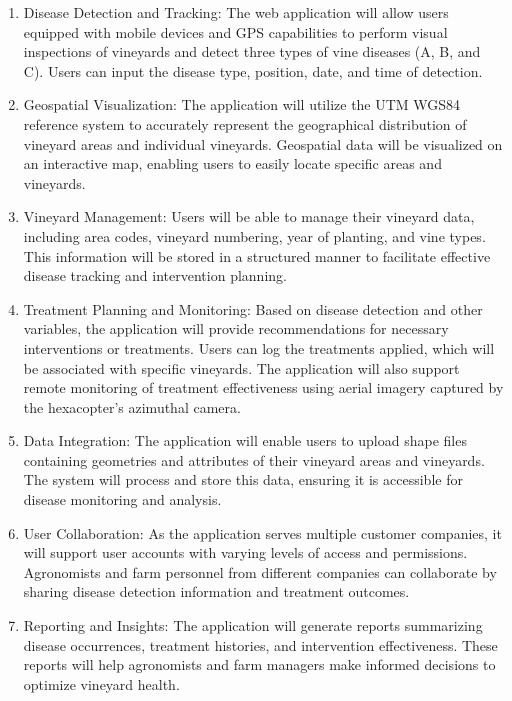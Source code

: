\begin{enumerate}
\item Disease Detection and Tracking: The web application will allow users equipped with mobile devices and GPS capabilities to perform visual inspections of vineyards and detect three types of vine diseases (A, B, and C). Users can input the disease type, position, date, and time of detection.

\item Geospatial Visualization: The application will utilize the UTM WGS84 reference system to accurately represent the geographical distribution of vineyard areas and individual vineyards. Geospatial data will be visualized on an interactive map, enabling users to easily locate specific areas and vineyards.

\item Vineyard Management: Users will be able to manage their vineyard data, including area codes, vineyard numbering, year of planting, and vine types. This information will be stored in a structured manner to facilitate effective disease tracking and intervention planning.

\item Treatment Planning and Monitoring: Based on disease detection and other variables, the application will provide recommendations for necessary interventions or treatments. Users can log the treatments applied, which will be associated with specific vineyards. The application will also support remote monitoring of treatment effectiveness using aerial imagery captured by the hexacopter's azimuthal camera.

\item Data Integration: The application will enable users to upload shape files containing geometries and attributes of their vineyard areas and vineyards. The system will process and store this data, ensuring it is accessible for disease monitoring and analysis.

\item User Collaboration: As the application serves multiple customer companies, it will support user accounts with varying levels of access and permissions. Agronomists and farm personnel from different companies can collaborate by sharing disease detection information and treatment outcomes.

\item Reporting and Insights: The application will generate reports summarizing disease occurrences, treatment histories, and intervention effectiveness. These reports will help agronomists and farm managers make informed decisions to optimize vineyard health.


\end{enumerate}
